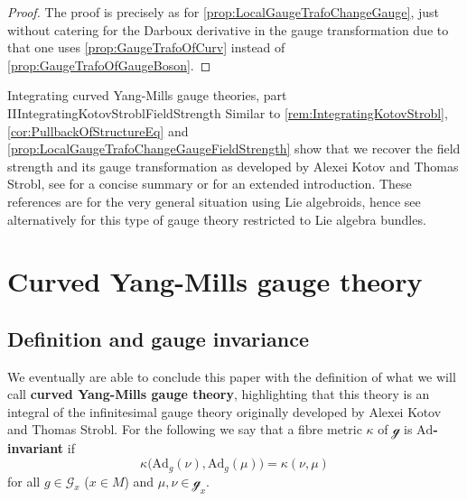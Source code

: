\documentclass[reqno,a4paper,oneside]{amsart}
\theoremstyle{plain}
\theoremstyle{remark}
\theoremstyle{definition}
\begin{document}
\begin{proof}
\leavevmode\newline
The proof is precisely as for \ref{prop:LocalGaugeTrafoChangeGauge}, just without catering for the Darboux derivative in the gauge transformation due to that one uses \ref{prop:GaugeTrafoOfCurv} instead of \ref{prop:GaugeTrafoOfGaugeBoson}.
\end{proof}

\begin{remarks}{Integrating curved Yang-Mills gauge theories, part II}{IntegratingKotovStroblFieldStrength}
Similar to \ref{rem:IntegratingKotovStrobl}, \ref{cor:PullbackOfStructureEq} and \ref{prop:LocalGaugeTrafoChangeGaugeFieldStrength} show that we recover the field strength and its gauge transformation as developed by Alexei Kotov and Thomas Strobl, see \cite{CurvedYMH} for a concise summary or \cite{MyThesis} for an extended introduction. These references are for the very general situation using Lie algebroids, hence see alternatively \cite{My1stpaper} for this type of gauge theory restricted to Lie algebra bundles.
\end{remarks}


\section{Curved Yang-Mills gauge theory}\label{CYMSection}

\subsection{Definition and gauge invariance}\label{CYMDefGaugeInv}

We eventually are able to conclude this paper with the definition of what we will call \textbf{curved Yang-Mills gauge theory}, highlighting that this theory is an integral of the infinitesimal gauge theory originally developed by Alexei Kotov and Thomas Strobl. For the following we say that a fibre metric $\kappa$ of $\mathcal{g}$ is \textbf{$\mathrm{Ad}$-invariant} if
\begin{equation*}
\kappa\bigl( \mathrm{Ad}_g(\nu), \mathrm{Ad}_g(\mu) \bigr)
=
\kappa (\nu, \mu)
\end{equation*}
for all $g \in \mathcal{G}_x$ ($x \in M$) and $\mu, \nu \in \mathcal{g}_x$.
\end{document}
